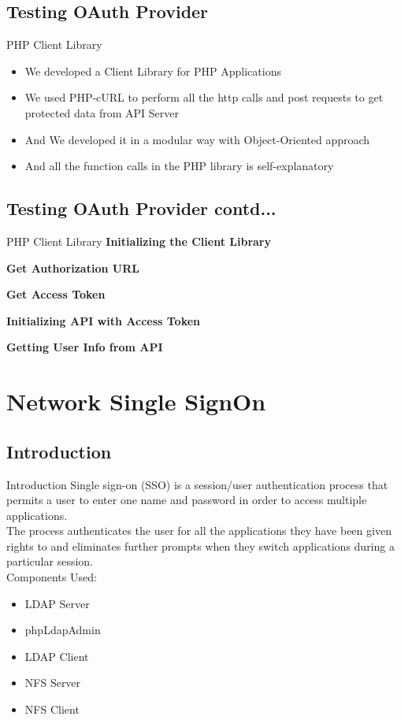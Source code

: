 \documentclass[10pt,xcolor=dvipsnames]{beamer}
\begin{document}
\subsection{Testing OAuth Provider}
\begin{frame}{PHP Client Library}
\begin{itemize}
	\item We developed a Client Library for PHP Applications
	\item We used PHP-cURL to perform all the http calls and post requests to get protected data from API Server
	\item And We developed it in a modular way with Object-Oriented approach
	\item And all the function calls in the PHP library is self-explanatory
\end{itemize}
\end{frame}

\subsection{Testing OAuth Provider contd...}
\begin{frame}{PHP Client Library}
\textbf{Initializing the Client Library}

\textbf{Get Authorization URL}

\textbf{Get Access Token}

\textbf{Initializing API with Access Token}

\textbf{Getting User Info from API}

\end{frame}
\section{Network Single SignOn}
\subsection{Introduction}
\begin{frame}{Introduction}
	Single sign-on (SSO) is a session/user authentication process that permits a user to enter one name and password in order to access multiple applications.\\
	The process authenticates the user for all the applications they have been given rights to and eliminates further prompts when they switch applications during a particular session.\\
	Components Used:
	\begin{itemize}
	\item LDAP Server
	\item phpLdapAdmin
	\item LDAP Client
	\item NFS Server
	\item NFS Client
	\end{itemize}
	
\end{frame}
\end{document}

